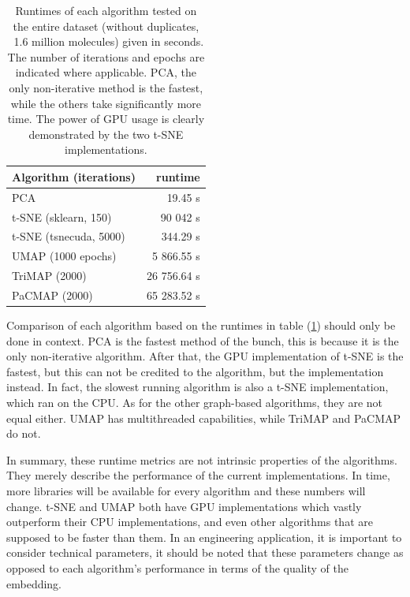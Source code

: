 \begin{table}[htb]
	\begin{center}
		\begin{tabular}{|l|r|}
			\hline
			Algorithm (iterations) & runtime \\
			\hline
			PCA & 19.45 s \\
			\hline
			t-SNE (sklearn, 150) & 90 042 s \\
			\hline
			t-SNE (tsnecuda, 5000) & 344.29 s \\
			\hline
			UMAP (1000 epochs) & 5 866.55 s \\
			\hline
			TriMAP (2000) & 26 756.64 s \\
			\hline
			PaCMAP (2000) & 65 283.52 s \\
			\hline
		\end{tabular}
	\end{center}
	\caption{Runtimes of each algorithm tested on the entire dataset (without duplicates, ~1.6 million molecules) given in seconds. The number of iterations and epochs are indicated where applicable. PCA, the only non-iterative method is the fastest, while the others take significantly more time. The power of GPU usage is clearly demonstrated by the two t-SNE implementations.}
	\label{tab:runtime}
\end{table}

Comparison of each algorithm based on the runtimes in table (\ref{tab:runtime}) should only be done in context. PCA is the fastest method of the bunch, this is because it is the only non-iterative algorithm. After that, the GPU implementation of t-SNE is the fastest, but this can not be credited to the algorithm, but the implementation instead. In fact, the slowest running algorithm is also a t-SNE implementation, which ran on the CPU. As for the other graph-based algorithms, they are not equal either. UMAP has multithreaded capabilities, while TriMAP and PaCMAP do not.

In summary, these runtime metrics are not intrinsic properties of the algorithms. They merely describe the performance of the current implementations. In time, more libraries will be available for every algorithm and these numbers will change. t-SNE and UMAP both have GPU implementations which vastly outperform their CPU implementations, and even other algorithms that are supposed to be faster than them. In an engineering application, it is important to consider technical parameters, it should be noted that these parameters change as opposed to each algorithm's performance in terms of the quality of the embedding.

